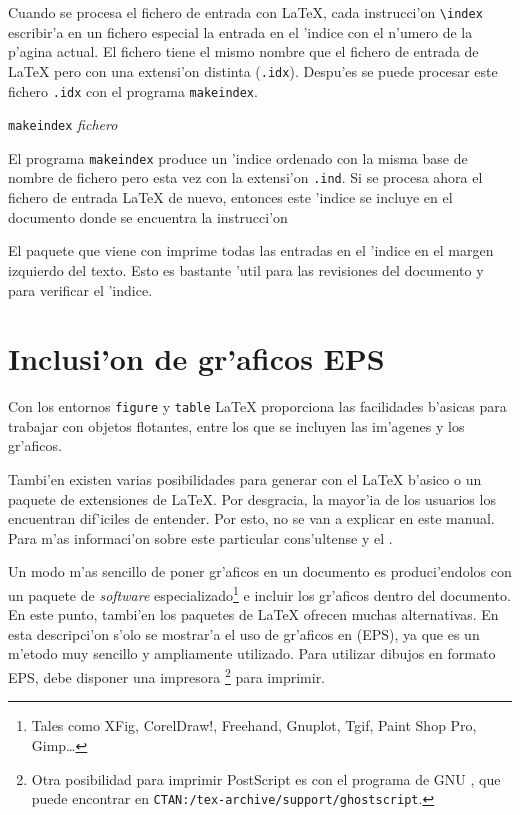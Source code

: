 Cuando se procesa el fichero de entrada con \LaTeX, cada instrucci'on
\verb|\index| escribir'a en un fichero especial la entrada en el
'indice con el n'umero de la p'agina actual. El fichero tiene el mismo
nombre que el fichero de entrada de \LaTeX{} pero con una extensi'on
distinta (\verb|.idx|). Despu'es se puede procesar este fichero
\texttt{.idx} con el programa \texttt{makeindex}.
\begin{command}
  \texttt{makeindex} \emph{fichero}
\end{command}
El programa \texttt{makeindex} produce un 'indice ordenado con la misma
base de nombre de fichero pero esta vez con la extensi'on
\texttt{.ind}. Si se procesa ahora el fichero de entrada \LaTeX{} de
nuevo, entonces este 'indice se incluye en el documento donde se
encuentra la instrucci'on
\begin{command}
\end{command}

El paquete  que viene con \LaTeXe{} imprime todas las
entradas en el 'indice en el margen izquierdo del texto. Esto es
bastante 'util para las revisiones del documento y para verificar el
'indice.


\section{Inclusi'on de gr'aficos EPS}
Con los entornos \texttt{figure} y \texttt{table} \LaTeX{} proporciona
las facilidades b'asicas para trabajar con objetos flotantes, entre
los que se incluyen las im'agenes y los gr'aficos.

Tambi'en existen varias posibilidades para generar  con
el \LaTeX{} b'asico o un paquete de extensiones de \LaTeX. Por
desgracia, la mayor'ia de los usuarios los encuentran dif'iciles de
entender. Por esto, no se van a explicar en este manual. Para m'as
informaci'on sobre este particular cons'ultense \companion{} y el
\manual.

Un modo m'as sencillo de poner gr'aficos en un documento es
produci'endolos con un paquete de \emph{software}
especializado\footnote{Tales como XFig, CorelDraw!, Freehand, Gnuplot,
  Tgif, Paint Shop Pro, Gimp\ldots} e incluir los gr'aficos dentro del
documento. En este punto, tambi'en los paquetes de \LaTeX{} ofrecen
muchas alternativas. En esta descripci'on s'olo se mostrar'a el uso de
gr'aficos en  (EPS), ya que es un m'etodo
muy sencillo y ampliamente utilizado. Para utilizar dibujos en formato
EPS, debe disponer una impresora \footnote{Otra
  posibilidad para imprimir PostScript es con el programa de GNU
  \textsc{}, que puede encontrar en
  \texttt{CTAN:/tex-archive/support/ghostscript}.} para imprimir.

